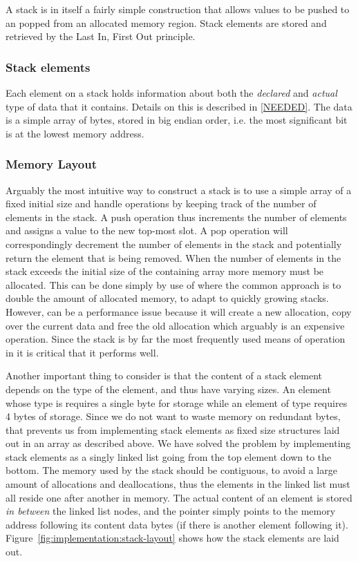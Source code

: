 A stack is in itself a fairly simple construction that allows values to be
pushed to an popped from an allocated memory region. Stack elements are stored
and retrieved by the Last In, First Out principle.

\subsubsection{Stack elements}

Each element on a stack holds information about both the \textit{declared} and
\textit{actual} type of data that it contains. Details on this is described in
\ref{NEEDED}. The data is a simple array of bytes, stored in big endian order,
i.e. the most significant bit is at the lowest memory address.

\subsubsection{Memory Layout}

Arguably the most intuitive way to construct a stack is to use a simple array of
a fixed initial size and handle operations by keeping track of the number of
elements in the stack. A push operation thus increments the number of elements
and assigns a value to the new top-most slot. A pop operation will
correspondingly decrement the number of elements in the stack and potentially
return the element that is being removed. When the number of elements in the
stack exceeds the initial size of the containing array more memory must be
allocated. This can be done simply by use of  where the common
approach is to double the amount of allocated memory, to adapt to quickly
growing stacks. However,  can be a performance issue because it
will create a new allocation, copy over the current data and free the old
allocation\cite{man-realloc} which arguably is an expensive operation. Since the
stack is by far the most frequently used means of operation in \thename{} it is
critical that it performs well.

Another important thing to consider is that the content of a stack element
depends on the type of the element, and thus have varying sizes. An element
whose type is  requires a single byte for storage while an element of
type  requires 4 bytes of storage. Since we do not want to waste
memory on redundant bytes, that prevents us from implementing stack elements as
fixed size structures laid out in an array as described above. We have solved
the problem by implementing stack elements as a singly linked list going from
the top element down to the bottom. The memory used by the stack should be
contiguous, to avoid a large amount of allocations and deallocations, thus the
elements in the linked list must all reside one after another in memory. The
actual content of an element is stored \textit{in between} the linked list
nodes, and the  pointer simply points to the memory address following
its content data bytes (if there is another element following
it). Figure~\ref{fig:implementation:stack-layout} shows how the stack elements
are laid out.

